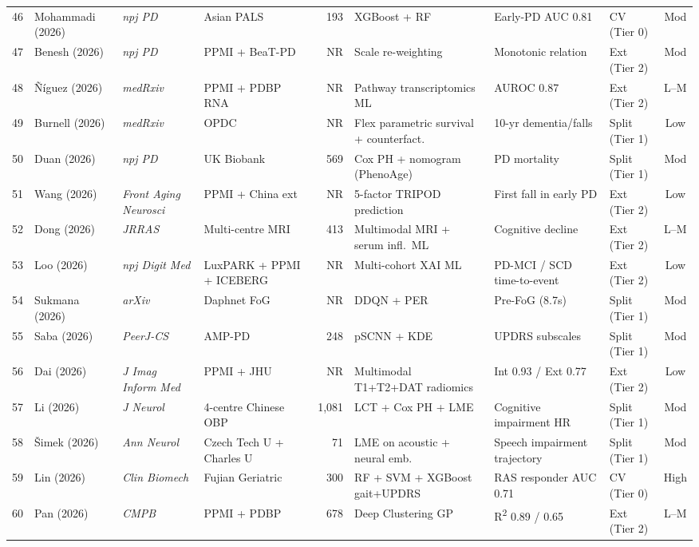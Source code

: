 \begin{landscape}
\begin{longtable}{@{}clllrlllc@{}}
46 & Mohammadi (2026)  & \textit{npj PD}          & Asian PALS        & 193    & XGBoost + RF      & Early-PD AUC 0.81  & CV (Tier 0)    & Mod  \\
47 & Benesh (2026)     & \textit{npj PD}          & PPMI + BeaT-PD    & NR     & Scale re-weighting & Monotonic relation & Ext (Tier 2)   & Mod  \\
48 & \~{N}\'{i}guez (2026) & \textit{medRxiv}     & PPMI + PDBP RNA   & NR     & Pathway transcriptomics ML & AUROC 0.87 & Ext (Tier 2)   & L--M \\
49 & Burnell (2026)    & \textit{medRxiv}         & OPDC              & NR     & Flex parametric survival + counterfact. & 10-yr dementia/falls & Split (Tier 1) & Low  \\
50 & Duan (2026)       & \textit{npj PD}          & UK Biobank        & 569    & Cox PH + nomogram (PhenoAge) & PD mortality  & Split (Tier 1) & Mod  \\
51 & Wang (2026)       & \textit{Front Aging Neurosci} & PPMI + China ext & NR & 5-factor TRIPOD prediction & First fall in early PD & Ext (Tier 2)   & Low  \\
52 & Dong (2026)       & \textit{JRRAS}           & Multi-centre MRI  & 413    & Multimodal MRI + serum infl.\ ML & Cognitive decline & Ext (Tier 2)   & L--M \\
53 & Loo (2026)        & \textit{npj Digit Med}   & LuxPARK + PPMI + ICEBERG & NR & Multi-cohort XAI ML & PD-MCI / SCD time-to-event & Ext (Tier 2)   & Low  \\
54 & Sukmana (2026)    & \textit{arXiv}           & Daphnet FoG       & NR     & DDQN + PER        & Pre-FoG (8.7s)     & Split (Tier 1) & Mod  \\
55 & Saba (2026)       & \textit{PeerJ-CS}        & AMP-PD            & 248    & pSCNN + KDE       & UPDRS subscales    & Split (Tier 1) & Mod  \\
56 & Dai (2026)        & \textit{J Imag Inform Med} & PPMI + JHU       & NR     & Multimodal T1+T2+DAT radiomics & Int 0.93 / Ext 0.77 & Ext (Tier 2)   & Low  \\
57 & Li (2026)         & \textit{J Neurol}        & 4-centre Chinese OBP & 1{,}081 & LCT + Cox PH + LME & Cognitive impairment HR & Split (Tier 1) & Mod  \\
58 & \v{S}imek (2026)  & \textit{Ann Neurol}      & Czech Tech U + Charles U & 71 & LME on acoustic + neural emb.\ & Speech impairment trajectory & Split (Tier 1) & Mod  \\
59 & Lin (2026)        & \textit{Clin Biomech}    & Fujian Geriatric  & 300    & RF + SVM + XGBoost gait+UPDRS & RAS responder AUC 0.71 & CV (Tier 0)    & High \\
60 & Pan (2026)        & \textit{CMPB}            & PPMI + PDBP       & 678    & Deep Clustering GP & R\textsuperscript{2} 0.89 / 0.65 & Ext (Tier 2)   & L--M \\
\end{longtable}
\end{landscape}


